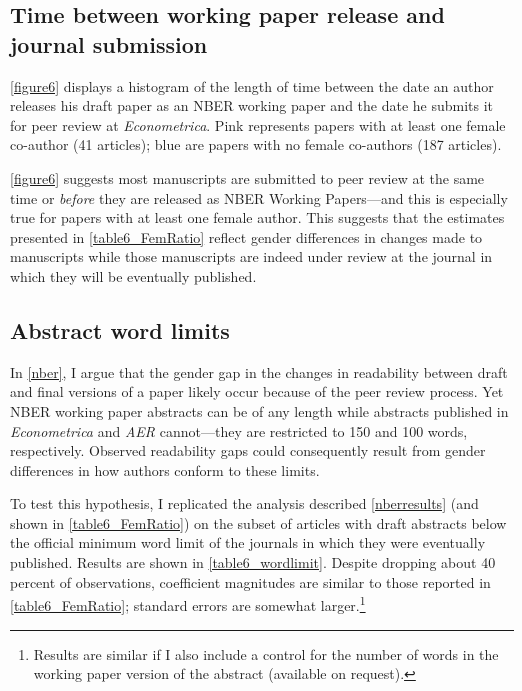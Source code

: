 \begin{appendices}
\begin{refsection}

\clearpage

\subsection{Time between working paper release and journal submission}
\label{appendixtiming}

\autoref{figure6} displays a histogram of the length of time between the date an author releases his draft paper as an NBER working paper and the date he submits it for peer review at \emph{Econometrica}. Pink represents papers with at least one female co-author (41 articles); blue are papers with no female co-authors (187 articles).

\autoref{figure6} suggests most manuscripts are submitted to peer review at the same time or \emph{before} they are released as NBER Working Papers---and this is especially true for papers with at least one female author. This suggests that the estimates presented in \autoref{table6_FemRatio} reflect gender differences in changes made to manuscripts while those manuscripts are indeed under review at the journal in which they will be eventually published.



\clearpage


\subsection{Abstract word limits}
\label{appendixwordlimits}

In \autoref{nber}, I argue that the gender gap in the changes in readability between draft and final versions of a paper likely occur because of the peer review process. Yet NBER working paper abstracts can be of any length while abstracts published in \emph{Econometrica} and \emph{AER} cannot---they are restricted to 150 and 100 words, respectively. Observed readability gaps could consequently result from gender differences in how authors conform to these limits.

To test this hypothesis, I replicated the analysis described \autoref{nberresults} (and shown in \autoref{table6_FemRatio}) on the subset of articles with draft abstracts below the official minimum word limit of the journals in which they were eventually published. Results are shown in \autoref{table6_wordlimit}. Despite dropping about 40 percent of observations, coefficient magnitudes are similar to those reported in \autoref{table6_FemRatio}; standard errors are somewhat larger.\footnote{Results are similar if I also include a control for the number of words in the working paper version of the abstract (available on request).}



\end{refsection}
\end{appendices}
